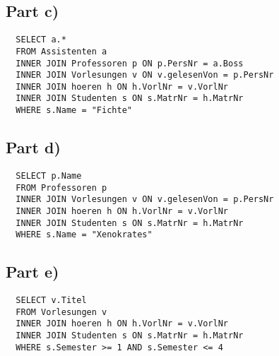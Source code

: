 \documentclass[10pt,a4paper]{article}
\begin{document}
\subsection*{Part c)}

\begin{verbatim}
  SELECT a.*
  FROM Assistenten a
  INNER JOIN Professoren p ON p.PersNr = a.Boss
  INNER JOIN Vorlesungen v ON v.gelesenVon = p.PersNr
  INNER JOIN hoeren h ON h.VorlNr = v.VorlNr
  INNER JOIN Studenten s ON s.MatrNr = h.MatrNr
  WHERE s.Name = "Fichte"
\end{verbatim}

\subsection*{Part d)}

\begin{verbatim}
  SELECT p.Name
  FROM Professoren p
  INNER JOIN Vorlesungen v ON v.gelesenVon = p.PersNr
  INNER JOIN hoeren h ON h.VorlNr = v.VorlNr
  INNER JOIN Studenten s ON s.MatrNr = h.MatrNr
  WHERE s.Name = "Xenokrates"
\end{verbatim}

\subsection*{Part e)}

\begin{verbatim}
  SELECT v.Titel
  FROM Vorlesungen v
  INNER JOIN hoeren h ON h.VorlNr = v.VorlNr
  INNER JOIN Studenten s ON s.MatrNr = h.MatrNr
  WHERE s.Semester >= 1 AND s.Semester <= 4
\end{verbatim}
\end{document}
